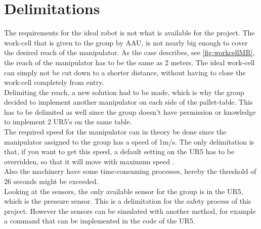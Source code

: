 \chapter{Delimitations} \label{ch:Delimitations}

The requirements for the ideal robot is not what is available for the project. 
The work-cell that is given to the group by AAU, is not nearly big enough to cover the desired reach of the manipulator. As the case describes, see \ref{fig:workcellMR}, the reach of the manipulator has to be the same as 2 meters. The ideal work-cell can simply not be cut down to a shorter distance, without having to close the work-cell completely from entry.\\
Delimiting the reach, a new solution had to be made, which is why the group decided to implement another manipulator on each side of the pallet-table. This has to be delimited as well since the group doesn't have permission or knowledge to implement 2 UR5's on the same table.\\
The required speed for the manipulator can in theory be done since the manipulator assigned to the group has a speed of 1m/s. The only delimitation is that, if you want to get this speed, a default setting on the UR5 has to be overridden, so that it will move with maximum speed \cite{UserManual}.\\
Also the machinery have some time-consuming processes, hereby the threshold of 26 seconds might be exceeded.\\
Looking at the sensors, the only available sensor for the group is in the UR5, which is the pressure sensor. This is a delimitation for the safety process of this project. However the sensors can be simulated with another method, for example a command that can be implemented in the code of the UR5.\\
